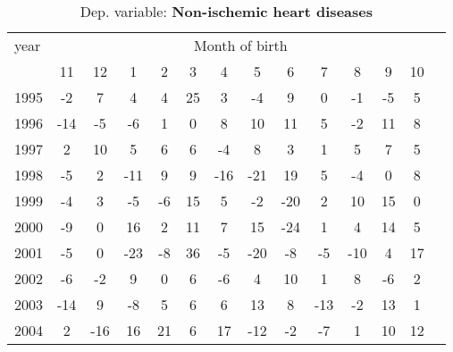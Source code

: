  \begin{table}[H] \begin{threeparttable} \centering \caption{Dep. variable: \textbf{Non-ischemic heart diseases}} {\def\sym#1{\ifmmode^{#1}\else\(^{#1}\)\fi} \begin{tabular}{l*{13}{c}} \toprule year & \multicolumn{12}{c}{Month of birth} \\ \cmidrule(lr){2-13} 
            &          11&          12&           1&           2&           3&           4&           5&           6&           7&           8&           9&          10\\
1995        &          -2&           7&           4&           4&          25&           3&          -4&           9&           0&          -1&          -5&           5\\
1996        &         -14&          -5&          -6&           1&           0&           8&          10&          11&           5&          -2&          11&           8\\
1997        &           2&          10&           5&           6&           6&          -4&           8&           3&           1&           5&           7&           5\\
1998        &          -5&           2&         -11&           9&           9&         -16&         -21&          19&           5&          -4&           0&           8\\
1999        &          -4&           3&          -5&          -6&          15&           5&          -2&         -20&           2&          10&          15&           0\\
2000        &          -9&           0&          16&           2&          11&           7&          15&         -24&           1&           4&          14&           5\\
2001        &          -5&           0&         -23&          -8&          36&          -5&         -20&          -8&          -5&         -10&           4&          17\\
2002        &          -6&          -2&           9&           0&           6&          -6&           4&          10&           1&           8&          -6&           2\\
2003        &         -14&           9&          -8&           5&           6&           6&          13&           8&         -13&          -2&          13&           1\\
2004        &           2&         -16&          16&          21&           6&          17&         -12&          -2&          -7&           1&          10&          12\\

\end{tabular}}
\end{threeparttable}
\end{table}
